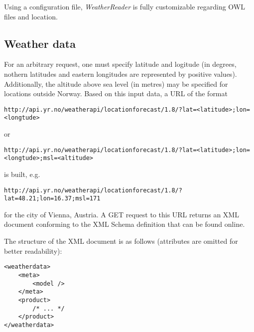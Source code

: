 
Using a configuration file, \emph{WeatherReader} is fully customizable regarding OWL files and location.

\subsection{Weather data}
\label{subsec:weather_data_yr_no}


For an arbitrary request, one must specify latitude and logitude (in degrees, nothern latitudes and eastern longitudes are represented by positive values). Additionally, the altitude above sea level (in metres) may be specified for locations outside Norway. Based on this input data, a URL of the format

\lstset{frame=trbl}
\begin{lstlisting}
http://api.yr.no/weatherapi/locationforecast/1.8/?lat=<latitude>;lon=<longtude>
\end{lstlisting}

or

\begin{lstlisting}
http://api.yr.no/weatherapi/locationforecast/1.8/?lat=<latitude>;lon=<longtude>;msl=<altitude>
\end{lstlisting}

is built, e.g.

\begin{lstlisting}
http://api.yr.no/weatherapi/locationforecast/1.8/?lat=48.21;lon=16.37;msl=171
\end{lstlisting}

for the city of Vienna, Austria. A GET request to this URL returns an XML document conforming to the XML Schema definition that can be found
online.

The structure of the XML document is as follows (attributes are omitted for better readability):

\begin{lstlisting}
<weatherdata>
	<meta>
		<model />
	</meta>
	<product>
		/* ... */
	</product>
</weatherdata>
\end{lstlisting}

